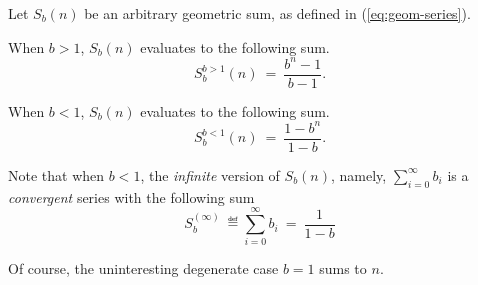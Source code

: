 \begin{prop}
\label{thm:sum-finite-geometric-series}
Let $S_{b}(n)$ be an arbitrary geometric sum, as defined in
(\ref{eq:geom-series}).

When $b > 1$, $S_{b}(n)$ evaluates to the following sum.
\begin{equation}
\label{eq:geom-sum:b>1}
S^{b>1}_{b}(n) \ = \ \frac{b^{n}- 1}{b - 1}.
\end{equation}

When $b < 1$, $S_{b}(n)$ evaluates to the following sum.
\begin{equation}
\label{eq:geom-sum:b<1}
S^{b<1}_{b}(n) \ = \ \frac{1 - b^n}{1-b}.
\end{equation}

Note that when $b < 1$, the {\em infinite} version of $S_b(n)$,
namely, $\sum_{i=0}^\infty b_i$ is a {\em convergent} series with the
following sum
\[ S_b^{(\infty)} \ \eqdef \sum_{i=0}^\infty b_i \ = \ \frac{1}{1-b} \]
\end{prop}

Of course, the uninteresting degenerate case $b=1$ sums to $n$.

